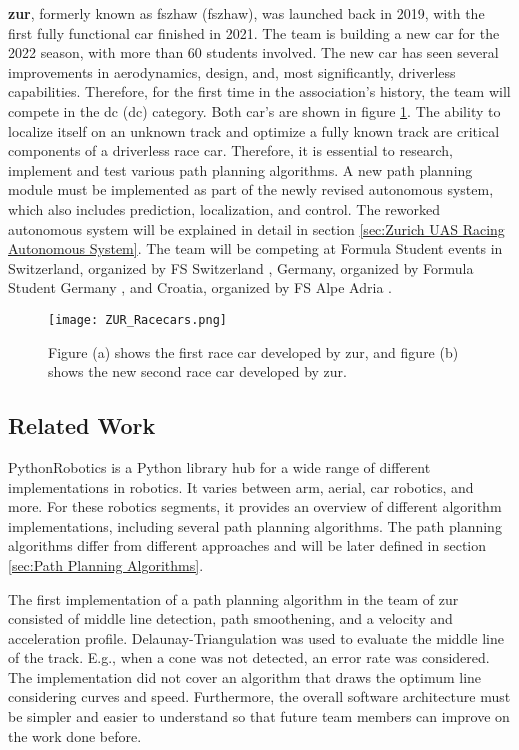 \textbf{\acrlong{zur}}, formerly known as \acrlong{fszhaw} (\acrshort{fszhaw}), was launched back in 2019, with the first fully functional car finished in 2021. The team is building a new car for the 2022 season, with more than 60 students involved. The new car has seen several improvements in aerodynamics, design, and, most significantly, driverless capabilities. \cite{fszhaw_launch}
Therefore, for the first time in the association's history, the team will compete in the \acrlong{dc} (\acrshort{dc}) category. Both car's are shown in figure \ref{fig:ZUR Racecars}.
The ability to localize itself on an unknown track and optimize a fully known track are critical components of a driverless race car. Therefore, it is essential to research, implement and test various path planning algorithms. A new path planning module must be implemented as part of the newly revised autonomous system, which also includes prediction, localization, and control. The reworked autonomous system will be explained in detail in section \ref{sec:Zurich UAS Racing Autonomous System}.
The team will be competing at Formula Student events in Switzerland, organized by FS Switzerland \cite{fsswitzerland}, Germany, organized by Formula Student Germany \cite{fs_germany}, and Croatia, organized by FS Alpe Adria \cite{fs_alpe_adria}.
\begin{figure}[H]
    \centering
    \texttt{[image: ZUR\_Racecars.png]}
    \caption{Figure (a) shows the first race car developed by \acrshort{zur}, and figure (b) shows the new second race car developed by \acrshort{zur}.}
    \label{fig:ZUR Racecars}
\end{figure}

\subsection{Related Work} \label{sec:Related Work}
PythonRobotics is a Python library hub for a wide range of different implementations in robotics. It varies between arm, aerial, car robotics, and more.
For these robotics segments, it provides an overview of different algorithm implementations, including several path planning algorithms. \cite{python_robotics}
The path planning algorithms differ from different approaches and will be later defined in section \ref{sec:Path Planning Algorithms}.

The first implementation of a path planning algorithm in the team of \acrshort{zur} consisted of middle line detection, path smoothening, and a velocity and acceleration profile. Delaunay-Triangulation was used to evaluate the middle line of the track. E.g., when a cone was not detected, an error rate was considered. The implementation did not cover an algorithm that draws the optimum line considering curves and speed. Furthermore, the overall software architecture must be simpler and easier to understand so that future team members can improve on the work done before. \cite{autopilot_for_formula_student_jerome}

